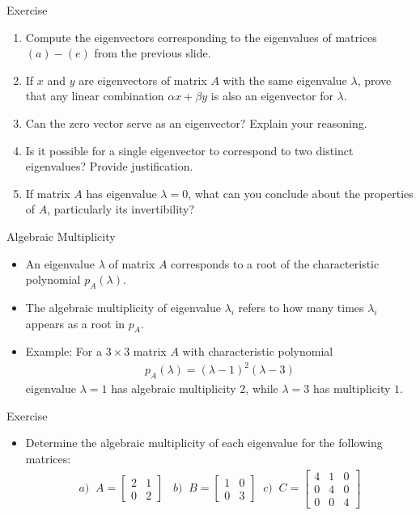 \begin{frame}{Exercise}
\begin{enumerate}
    \item Compute the eigenvectors corresponding to the eigenvalues of matrices $(a)-(e)$ from the previous slide.
    \item If \( x \) and \( y \) are eigenvectors of matrix \( A \) with the same eigenvalue \( \lambda \), prove that any linear combination \( \alpha x + \beta y \) is also an eigenvector for \( \lambda \).
    \item Can the zero vector serve as an eigenvector? Explain your reasoning.
    \item Is it possible for a single eigenvector to correspond to two distinct eigenvalues? Provide justification.
    \item If matrix \( A \) has eigenvalue \( \lambda = 0 \), what can you conclude about the properties of \( A \), particularly its invertibility?
\end{enumerate}
\end{frame}
\begin{frame}{Algebraic Multiplicity}
    \begin{itemize}
        \item An eigenvalue $\lambda$ of matrix $A$ corresponds to a root of the characteristic polynomial $p_A(\lambda)$.
        \item The algebraic multiplicity of eigenvalue $\lambda_i$ refers to how many times $\lambda_i$ appears as a root in $p_A$.
        \item Example: For a $3\times 3$ matrix $A$ with characteristic polynomial 
        \begin{align}
            p_A(\lambda) = (\lambda -1)^2(\lambda-3)
        \end{align}
        eigenvalue $\lambda=1$ has algebraic multiplicity $2$, while $\lambda=3$ has multiplicity $1$.
    \end{itemize}
\end{frame}
\begin{frame}{Exercise}
\begin{itemize}
    \item Determine the algebraic multiplicity of each eigenvalue for the following matrices:
    \begin{align}
a)\;\; A = \begin{bmatrix} 2 & 1 \\ 0 & 2 \end{bmatrix}\;\;\; b)\;\; B = \begin{bmatrix} 1 & 0 \\ 0 & 3 \end{bmatrix}\;\; c)\;\; C = \begin{bmatrix} 4 & 1 & 0 \\ 0 & 4 & 0 \\ 0 & 0 & 4 \end{bmatrix}
    \end{align}
\end{itemize}
\end{frame}



